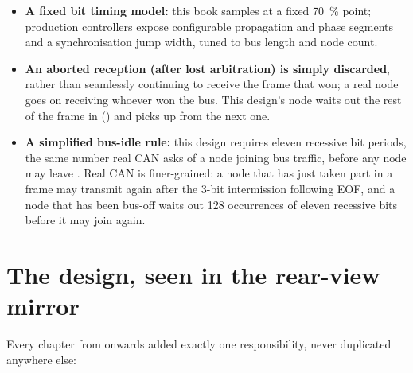 \begin{itemize}
  \item \textbf{A fixed bit timing model:} this book samples at a fixed 70~\% point; production
    controllers expose configurable propagation and phase segments and a synchronisation jump width,
    tuned to bus length and node count.
  \item \textbf{An aborted reception (after lost arbitration) is simply discarded}, rather than
    seamlessly continuing to receive the frame that won; a real node goes on receiving whoever won the
    bus. This design's node waits out the rest of the frame in 
    () and picks up from the next one.
  \item \textbf{A simplified bus-idle rule:} this design requires eleven recessive bit periods, the
    same number real CAN asks of a node joining bus traffic, before any node may leave
    . Real CAN is finer-grained: a node that has just taken part in a frame may
    transmit again after the 3-bit intermission following EOF, and a node that has been bus-off waits
    out 128 occurrences of eleven recessive bits before it may join again.
\end{itemize}

\section{The design, seen in the rear-view mirror}
\label{c19:sec:review-design}

Every chapter from  onwards added exactly one responsibility, never duplicated
anywhere else:

